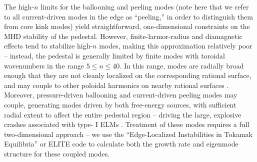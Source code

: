 \begin{figure}
 \pushtooutside
\end{figure}

The high-$n$ limits for the ballooning and peeling modes (note here that we refer to all current-driven modes in the edge as ``peeling,'' in order to distinguish them from core kink modes) yield straightforward, one-dimensional constraints on the MHD stability of the pedestal.  However, finite-larmor-radius and diamagnetic effects tend to stabilize high-$n$ modes, making this approximation relatively poor \cite{Snyder2004} -- instead, the pedestal is generally limited by finite modes with toroidal wavenumbers in the range $5 \le n \le 40$.  In this range, modes are radially broad enough that they are not cleanly localized on the corresponding rational surface, and may couple to other poloidal harmonics on nearby rational surfaces \cite{Connor1998a}.  Moreover, pressure-driven ballooning and current-driven peeling modes may couple, generating modes driven by both free-energy sources, with sufficient radial extent to affect the entire pedestal region -- driving the large, explosive crashes associated with type-
I ELMs \cite{Wilson2002}.  Treatment of these modes requires a full two-dimensional approach -- we use the ``Edge-Localized Instabilities in Tokamak Equilibria'' or ELITE code \cite{Wilson1999,Wilson2002,Snyder2002} to calculate both the growth rate and eigenmode structure for these coupled modes.

